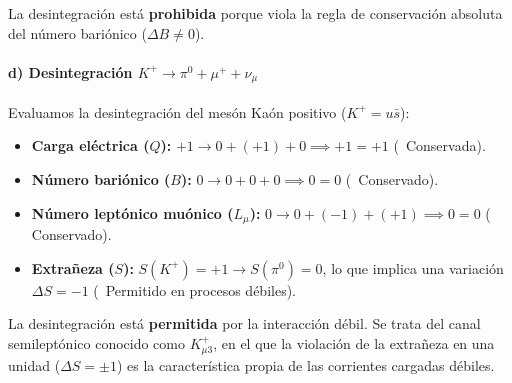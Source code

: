 \begin{problema}
\begin{observacion}
La desintegración está \textbf{prohibida} porque viola la regla de conservación absoluta del número bariónico ($\Delta B \neq 0$).
\end{observacion}

\paragraph{d) Desintegración $K^+ \to \pi^0 + \mu^+ + \nu_\mu$}
Evaluamos la desintegración del mesón Kaón positivo ($K^+ = u\bar{s}$):
\begin{itemize}
    \item \textbf{Carga eléctrica ($Q$):} $+1 \to 0 + (+1) + 0 \implies +1 = +1$ \quad (\checkmark \, Conservada).
    \item \textbf{Número bariónico ($B$):} $0 \to 0 + 0 + 0 \implies 0 = 0$ \quad (\checkmark \, Conservado).
    \item \textbf{Número leptónico muónico ($L_\mu$):} $0 \to 0 + (-1) + (+1) \implies 0 = 0$ \quad (\checkmark \, Conservado).
    \item \textbf{Extrañeza ($S$):} $S(K^+) = +1 \to S(\pi^0) = 0$, lo que implica una variación $\Delta S = -1$ \quad (\checkmark \, Permitido en procesos débiles).
\end{itemize}

\begin{observacion}
La desintegración está \textbf{permitida} por la interacción débil. Se trata del canal semileptónico conocido como $K_{\mu 3}^+$, en el que la violación de la extrañeza en una unidad ($\Delta S = \pm 1$) es la característica propia de las corrientes cargadas débiles.
\end{observacion}

\end{problema}

